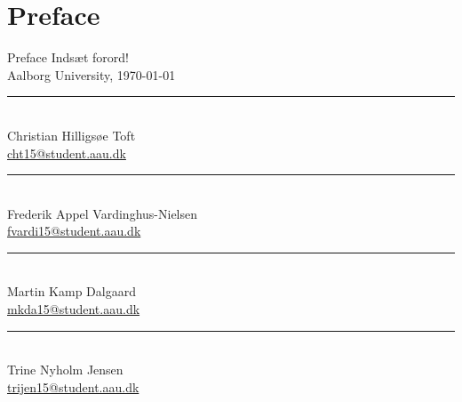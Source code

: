 \clearpage
\chapter*{Preface}
{Preface}
Indsæt forord!
\\
\vspace{\baselineskip}\hfill Aalborg University, \today
\vfill\noindent
\begin{minipage}[b]{0.45\textwidth}
 \centering
 \rule{\textwidth}{0.5pt}\\
Christian Hilligsøe Toft\\
 {\footnotesize \href{mailto:cht15@student.aau.dk}{cht15@student.aau.dk}}  
\end{minipage}
\hfill
\begin{minipage}[b]{0.45\textwidth}
 \centering
 \rule{\textwidth}{0.5pt}\\
Frederik Appel Vardinghus-Nielsen\\
 {\footnotesize \href{mailto:fvardi15@student.aau.dk}{fvardi15@student.aau.dk}}
\end{minipage}
\vspace{3\baselineskip}
\vspace{1\baselineskip}
\begin{minipage}[b]{0.45\textwidth}
 \centering
 \rule{\textwidth}{0.5pt}\\
Martin Kamp Dalgaard\\
 {\footnotesize \href{mailto:mkda15@student.aau.dk}{mkda15@student.aau.dk}}  
\end{minipage}
\hfill
\begin{minipage}[b]{0.45\textwidth}
 \centering
 \rule{\textwidth}{0.5pt}\\
 Trine Nyholm Jensen\\
 {\footnotesize \href{mailto:trijen15@student.aau.dk}{trijen15@student.aau.dk}}  
\end{minipage}
\vspace{2\baselineskip}
\vspace{1\baselineskip}